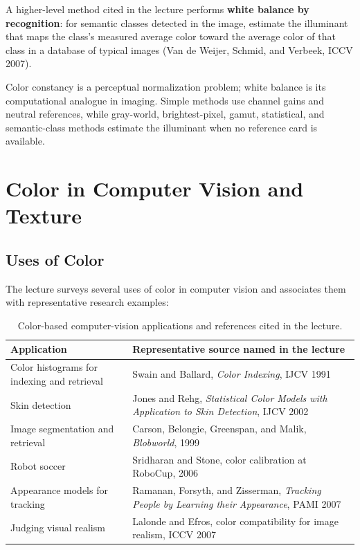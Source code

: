 \documentclass[11pt,a4paper,oneside]{report}
\begin{document}
A higher-level method cited in the lecture performs \textbf{white balance by recognition}: for semantic classes detected in the image, estimate the illuminant that maps the class's measured average color toward the average color of that class in a database of typical images (Van de Weijer, Schmid, and Verbeek, ICCV 2007).

\FloatBarrier
\begin{chaptersummary}
Color constancy is a perceptual normalization problem; white balance is its computational analogue in imaging. Simple methods use channel gains and neutral references, while gray-world, brightest-pixel, gamut, statistical, and semantic-class methods estimate the illuminant when no reference card is available.
\end{chaptersummary}

\chapter{Color in Computer Vision and Texture}

\section{Uses of Color}

The lecture surveys several uses of color in computer vision and associates them with representative research examples:
\begin{table}[htbp]
\centering
\caption{Color-based computer-vision applications and references cited in the lecture.}
\label{tab:color-applications}
\begin{tabularx}{\textwidth}{@{}Y Y@{}}
\toprule
{}
\textbf{Application} & \textbf{Representative source named in the lecture} \\
\midrule
Color histograms for indexing and retrieval & Swain and Ballard, \emph{Color Indexing}, IJCV 1991 \\
Skin detection & Jones and Rehg, \emph{Statistical Color Models with Application to Skin Detection}, IJCV 2002 \\
Image segmentation and retrieval & Carson, Belongie, Greenspan, and Malik, \emph{Blobworld}, 1999 \\
Robot soccer & Sridharan and Stone, color calibration at RoboCup, 2006 \\
Appearance models for tracking & Ramanan, Forsyth, and Zisserman, \emph{Tracking People by Learning their Appearance}, PAMI 2007 \\
Judging visual realism & Lalonde and Efros, color compatibility for image realism, ICCV 2007 \\
\bottomrule
\end{tabularx}
\end{table}
\end{document}
